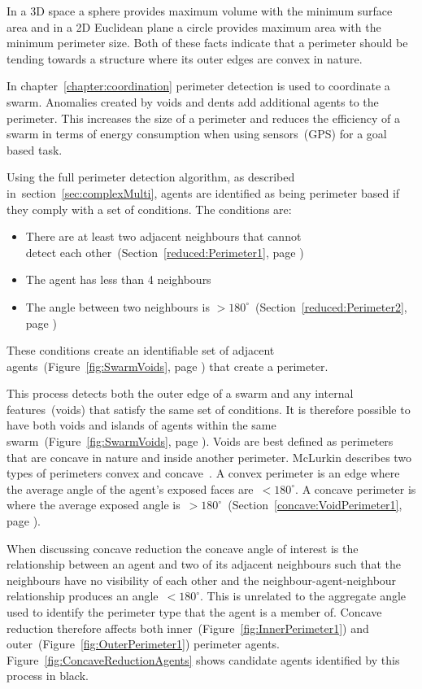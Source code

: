 In a 3D space a sphere provides maximum volume with the minimum surface area and in a 2D Euclidean plane a circle provides maximum area with the minimum perimeter size. Both of these facts indicate that a perimeter should be tending towards a structure where its outer edges are convex in nature. 

In chapter~\ref{chapter:coordination} perimeter detection is used to coordinate a swarm. Anomalies created by voids and dents add additional agents to the perimeter. This increases the size of a perimeter and reduces the efficiency of a swarm in terms of energy consumption when using sensors~(GPS) for a goal based task. 
 
Using the full perimeter detection algorithm, as described in~section~\ref{sec:complexMulti}, agents are identified as being perimeter based if they comply with a set of conditions. The conditions are: 
\begin{itemize}
  \item There are at least two adjacent neighbours that cannot\\detect each other~(Section~\ref{reduced:Perimeter1}, page \pageref{reduced:Perimeter1})
  \item The agent has less than 4 neighbours
  \item The angle between two neighbours is $> 180^\circ$~(Section~\ref{reduced:Perimeter2}, page \pageref{reduced:Perimeter2})
\end{itemize} 
These conditions create an identifiable set of adjacent agents~(Figure~\ref{fig:SwarmVoids}, page \pageref{fig:SwarmVoids}) that create a perimeter.

This process detects both the outer edge of a swarm and any internal features~(voids) that satisfy the same set of conditions. It is therefore possible to have both voids and islands of agents within the same swarm~(Figure~\ref{fig:SwarmVoids}, page \pageref{fig:SwarmVoids}). Voids are best defined as perimeters that are concave in nature and inside another perimeter. McLurkin describes two types of perimeters convex and concave~\cite{MD:09}. A convex perimeter is an edge where the average angle of the agent's exposed faces are~$< 180^\circ$. A concave perimeter is where the average exposed angle is~$> 180^\circ$~(Section~\ref{concave:VoidPerimeter1}, page \pageref{concave:VoidPerimeter1}).
 
When discussing concave reduction the concave angle of interest is the relationship between an agent and two of its adjacent neighbours such that the neighbours have no visibility of each other and the neighbour-agent-neighbour relationship produces an angle~$< 180^\circ$. This is unrelated to the aggregate angle used to identify the perimeter type that the agent is a member of. Concave reduction therefore affects both inner~(Figure~\ref{fig:InnerPerimeter1}) and outer~(Figure~\ref{fig:OuterPerimeter1}) perimeter agents. Figure~\ref{fig:ConcaveReductionAgents} shows candidate agents identified by this process in black. 

